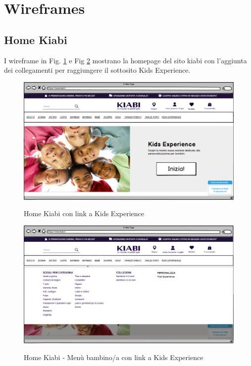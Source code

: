 \documentclass[12pt,italian,]{report}
\begin{document}
\section{Wireframes}\label{Wireframes}

\subsection{Home Kiabi}


I wireframe in Fig. \ref{kiabi_home} e Fig \ref{kiabi_home_selection} mostrano la homepage del sito kiabi con l'aggiunta dei collegamenti per raggiungere il sottosito Kids Experience.

\begin{figure}[h]
\centering
\includegraphics{balsamiq/Kiabi Home.png}
\label{kiabi_home}
\caption{Home Kiabi con link a Kids Experience}
\end{figure}

\begin{figure}[h]
\centering
\includegraphics{balsamiq/Kiabi Scelta.png}
\label{kiabi_home_selection}
\caption{Home Kiabi - Menù bambino/a con link a Kids Experience}
\end{figure}
\end{document}
